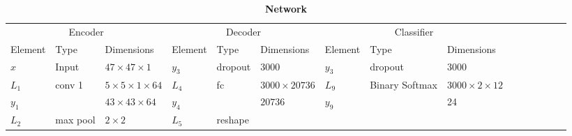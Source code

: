 \begin{landscape}
	\begin{table}[h] {\footnotesize
			\centering
			\caption*{\textbf{Network \networkIII}}
			\begin{tabular}{lllllllllllllll}
				\cline{1-9}
				\multicolumn{3}{|c|}{Encoder}                                                                      & \multicolumn{3}{c|}{Decoder}                                                 & \multicolumn{3}{c|}{Classifier}                                                            &  &  &  &  &  &  \\ \cline{1-9}
				\multicolumn{1}{|l|}{Element} & Type     & \multicolumn{1}{l|}{Dimensions}                  & \multicolumn{1}{l|}{Element} & Type     & \multicolumn{1}{l|}{Dimensions}                   & \multicolumn{1}{l|}{Element} & Type           & \multicolumn{1}{l|}{Dimensions}            &   &                             &         &                             &                            &   \\ \cline{1-9}
				\multicolumn{1}{|l|}{$x$}     & Input    & \multicolumn{1}{l|}{$47\times 47 \times 1$}      & \multicolumn{1}{l|}{$y_3$}   & dropout  & \multicolumn{1}{l|}{3000}                         & \multicolumn{1}{l|}{$y_3$}   & dropout        & \multicolumn{1}{l|}{3000}                  &   &                             &         &                             &                            &   \\ \cline{1-9}
				\multicolumn{1}{|l|}{$L_1$}   & conv 1   & \multicolumn{1}{l|}{$5\times 5\times1\times 64$} & \multicolumn{1}{l|}{$L_4$}   & fc       & \multicolumn{1}{l|}{$3000\times20736$}            & \multicolumn{1}{l|}{$L_9$}   & Binary Softmax & \multicolumn{1}{l|}{$3000\times2\times12$} &   &                             &         &                             &                            &   \\
				\multicolumn{1}{|l|}{$y_1$}   &          & \multicolumn{1}{l|}{$43\times43\times64$}        & \multicolumn{1}{l|}{$y_4$}   &          & \multicolumn{1}{l|}{$20736$}                      & \multicolumn{1}{l|}{$y_9$}   &                & \multicolumn{1}{l|}{24}                    &   &                             &         &                             &                            &   \\ \cline{1-9}
				\multicolumn{1}{|l|}{$L_2$}   & max pool & \multicolumn{1}{l|}{$2\times 2$}                 & \multicolumn{1}{l|}{$L_5$}   & reshape  & \multicolumn{1}{l|}{}                             &                              &                & \multicolumn{1}{l}{}                       &   &                             &         &                             &                            &   \\

\end{tabular}}
\end{table}
\end{landscape}

